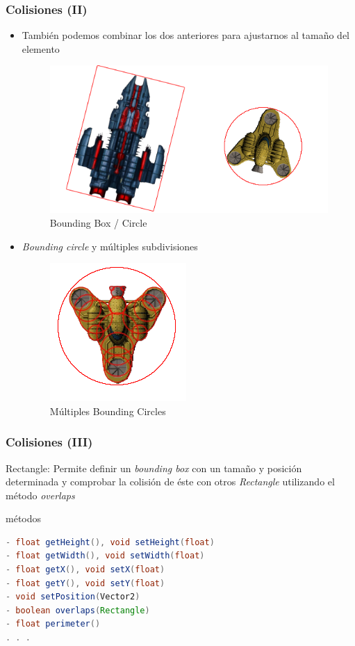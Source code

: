 \documentclass[xcolor={dvipsnames}]{beamer}
\begin{document}
\begin{frame}[fragile]\frametitle{Colisiones (II)}
    \begin{itemize}
        \item También podemos combinar los dos anteriores para ajustarnos al tamaño del elemento
            \begin{figure}
            \includegraphics[scale=0.2]{images/collisions3}
            \caption{Bounding Box / Circle}
            \end{figure}
        \item \emph{Bounding circle} y múltiples subdivisiones
            \begin{figure}
            \includegraphics[scale=0.2]{images/collisions4}
            \caption{Múltiples Bounding Circles}
            \end{figure}
    \end{itemize}
\end{frame}

\begin{frame}[fragile]\frametitle{Colisiones (III)}
    \textcolor{resalta}{Rectangle}: Permite definir un \emph{bounding box} con un tamaño y posición determinada y comprobar la
        colisión de éste con otros \emph{Rectangle} utilizando el método \emph{overlaps}
    \begin{exampleblock}{métodos}
    \begin{lstlisting}[language=java]
- float getHeight(), void setHeight(float)
- float getWidth(), void setWidth(float)
- float getX(), void setX(float)
- float getY(), void setY(float)
- void setPosition(Vector2)
- boolean overlaps(Rectangle)
- float perimeter()
. . .
    \end{lstlisting}
    \end{exampleblock}
\end{frame}
\end{document}
